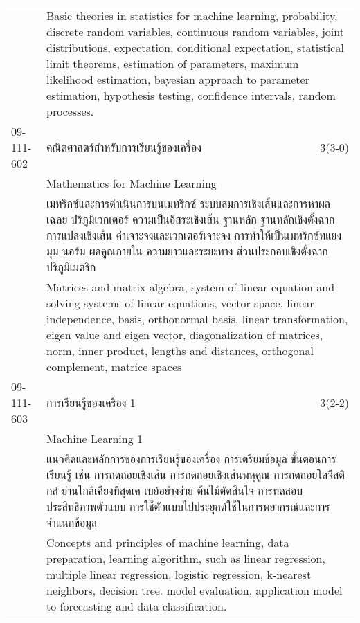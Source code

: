 \begin{longtable}{p{}p{}r{}}
&  \multicolumn{2}{p{0.75\textwidth}}{Basic theories in statistics for machine learning, probability, discrete random variables, continuous random variables, joint distributions, expectation, conditional expectation, statistical limit theorems, estimation of parameters, maximum likelihood estimation, bayesian approach to parameter estimation, hypothesis testing, confidence intervals, random processes.} \vspace{8mm} \\*
09-111-602 & คณิตศาสตร์สำหรับการเรียนรู้ของเครื่อง & 3(3-0)\\*
 & Mathematics for Machine Learning & \phantom{x} \vspace{3mm} \\*
&  \multicolumn{2}{p{0.75\textwidth}}{เมทริกซ์และการดำเนินการบนเมทริกซ์ ระบบสมการเชิงเส้นและการหาผลเฉลย ปริภูมิเวกเตอร์ ความเป็นอิสระเชิงเส้น ฐานหลัก ฐานหลักเชิงตั้งฉาก การแปลงเชิงเส้น ค่าเจาะจงและเวกเตอร์เจาะจง การทำให้เป็นเมทริกซ์ทแยงมุม นอร์ม ผลคูณภายใน ความยาวและระยะทาง ส่วนประกอบเชิงตั้งฉาก ปริภูมิเมตริก } \vspace{3mm} \\*
&  \multicolumn{2}{p{0.75\textwidth}}{Matrices and matrix algebra, system of linear equation and solving systems of linear equations, vector space, linear independence, basis, orthonormal basis, linear transformation, eigen value and eigen vector, diagonalization of matrices, norm, inner product, lengths and distances, orthogonal complement, matrice spaces} \vspace{8mm} \\*
09-111-603 & การเรียนรู้ของเครื่อง 1 & 3(2-2)\\*
 & Machine Learning 1 & \phantom{x} \vspace{3mm} \\*
&  \multicolumn{2}{p{0.75\textwidth}}{แนวคิดและหลักการของการเรียนรู้ของเครื่อง การเตรียมข้อมูล ขั้นตอนการเรียนรู้ เช่น การถดถอยเชิงเส้น การถดถอยเชิงเส้นพหุคูณ การถดถอยโลจีสติกส์ ย่านใกล้เคียงที่สุดเค เบย์อย่างง่าย ต้นไม้ตัดสินใจ การทดสอบประสิทธิภาพตัวแบบ การใช้ตัวแบบไปประยุกต์ใช้ในการพยากรณ์และการจำแนกข้อมูล} \vspace{3mm} \\*
&  \multicolumn{2}{p{0.75\textwidth}}{Concepts and principles of machine learning, data preparation, learning algorithm, such as linear regression, multiple linear regression, logistic regression, k-nearest neighbors, decision tree. model evaluation, application model to forecasting and data classification.} \vspace{8mm} \\*

\end{longtable}
